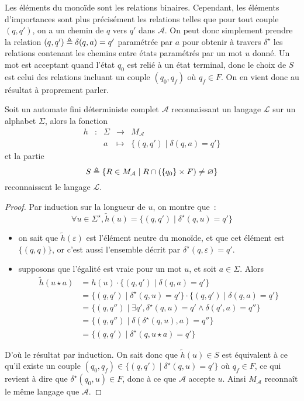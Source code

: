 Les éléments du monoïde sont les relations binaires. Cependant, les éléments
d'importances sont plus précisément les relations telles que pour tout couple
$(q,q')$, on a un chemin de $q$ vers $q'$ dans $\mathcal A$. On peut donc
simplement prendre la relation $(q,q') \triangleq \delta(q,a) = q'$ paramétrée par
$a$ pour obtenir à travers $\delta^\star$ les relations contenant les chemins
entre états paramétrés par un mot $u$ donné. Un mot est acceptant quand l'état
$q_0$ est relié à un état terminal, donc le choix de $S$ est celui des
relations incluant un couple $(q_0,q_f)$ où $q_f \in F$. On en vient donc au
résultat à proprement parler.

\begin{proposition}
  Soit un automate fini déterministe complet $\mathcal A$ reconnaissant un
  langage $\mathcal L$ sur un alphabet $\Sigma$, alors la fonction
  \[\begin{array}{ccccc}
  h & : & \Sigma & \longrightarrow & M_\mathcal A\\
  & & a &\longmapsto & \{(q,q') \mid \delta(q,a) = q'\}
  \end{array}\]
  et la partie
  \[S \triangleq \{R \in M_\mathcal A\mid
  R \cap (\{q_0\}\times F)\neq\varnothing\}\]
  reconnaissent le langage $\mathcal L$.
\end{proposition}

\begin{proof}
  Par induction sur la longueur de $u$, on montre que~:
  \[\forall u\in \Sigma^\star, \tilde h(u) =
  \{(q,q') \mid \delta^\star(q,u) = q'\}\]
  \begin{itemize}
  \item on sait que $\tilde h(\varepsilon)$ est l'élément neutre du monoïde,
    et que cet élément est $\{(q,q)\}$, or c'est aussi l'ensemble décrit par
    $\delta^\star(q,\varepsilon) = q'$.
  \item supposons que l'égalité est vraie pour un mot $u$, et soit
    $a \in \Sigma$. Alors
    \begin{align*}
      \tilde h(u\star a) &= h(u) \cdot \{(q,q')\mid \delta(q,a) = q'\}\\
      &= \{(q,q')\mid \delta^\star(q,u) = q'\}\cdot
      \{(q,q')\mid \delta(q,a) = q'\}\\
      &= \{(q,q'')\mid \exists q',
      \delta^\star(q,u) = q' \land \delta(q',a) = q''\}\\
      &= \{(q,q'')\mid \delta(\delta^\star(q,u),a) = q''\}\\
      &= \{(q,q')\mid \delta^\star(q,u\star a) = q'\}
    \end{align*}
  \end{itemize}
  D'où le résultat par induction. On sait donc que $\tilde h(u) \in S$ est
  équivalent à ce qu'il existe un couple
  $(q_0,q_f) \in \{(q,q')\mid \delta^\star(q,u) = q'\}$ où $q_f \in F$, ce
  qui revient à dire que $\delta^\star(q_0,u) \in F$, donc à ce que $\mathcal A$
  accepte $u$. Ainsi $M_\mathcal A$ reconnaît le même langage que
  $\mathcal A$.
\end{proof}
